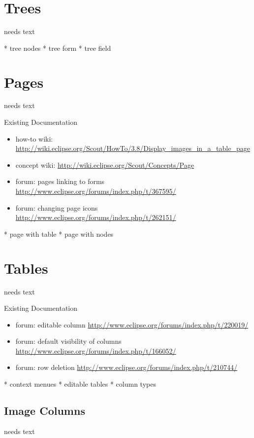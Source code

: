 \documentclass[a4paper,10pt,twoside]{book}
\begin{document}
\section{Trees}
needs text

    * tree nodes
	* tree form
	* tree field

\section{Pages}
needs text

\noindent Existing Documentation
\begin{itemize}
  \item how-to wiki: \url{http://wiki.eclipse.org/Scout/HowTo/3.8/Display_images_in_a_table_page}	
  \item concept wiki: \url{http://wiki.eclipse.org/Scout/Concepts/Page}
  \item forum: pages linking to forms \url{http://www.eclipse.org/forums/index.php/t/367595/}
  \item forum: changing page icons \url{http://www.eclipse.org/forums/index.php/t/262151/}
\end{itemize}

    * page with table
	* page with nodes

\section{Tables}
needs text

\noindent Existing Documentation
\begin{itemize}
  \item forum: editable column \url{http://www.eclipse.org/forums/index.php/t/220019/}
  \item forum: default visibility of columns \url{http://www.eclipse.org/forums/index.php/t/166052/}
  \item forum: row deletion \url{http://www.eclipse.org/forums/index.php/t/210744/}
\end{itemize}

	* context menues
	* editable tables
    * column types

\subsection{Image Columns}
needs text
\end{document}
